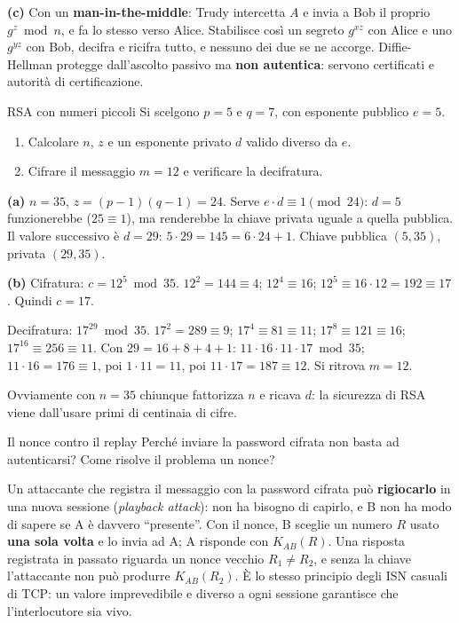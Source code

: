 \textbf{(c)} Con un \textbf{man-in-the-middle}: Trudy intercetta $A$ e invia a Bob il proprio $g^z \bmod n$, e fa lo stesso verso Alice.
Stabilisce così un segreto $g^{xz}$ con Alice e uno $g^{yz}$ con Bob, decifra e ricifra tutto, e nessuno dei due se ne accorge.
Diffie-Hellman protegge dall'ascolto passivo ma \textbf{non autentica}: servono certificati e autorità di certificazione.

\begin{esercizio}{RSA con numeri piccoli}
Si scelgono $p = 5$ e $q = 7$, con esponente pubblico $e = 5$.
\begin{enumerate}[label=(\alph*)]
    \item Calcolare $n$, $z$ e un esponente privato $d$ valido diverso da $e$.
    \item Cifrare il messaggio $m = 12$ e verificare la decifratura.
\end{enumerate}
\end{esercizio}

\svolgimento
\textbf{(a)} $n = 35$, $z = (p-1)(q-1) = 24$. Serve $e \cdot d \equiv 1 \pmod{24}$: $d = 5$ funzionerebbe ($25 \equiv 1$), ma renderebbe
la chiave privata uguale a quella pubblica. Il valore successivo è $d = 29$: $5 \cdot 29 = 145 = 6 \cdot 24 + 1$. Chiave pubblica $(5, 35)$,
privata $(29, 35)$.

\textbf{(b)} Cifratura: $c = 12^5 \bmod 35$. $12^2 = 144 \equiv 4$; $12^4 \equiv 16$; $12^5 \equiv 16 \cdot 12 = 192 \equiv 17$. Quindi $c = 17$.

Decifratura: $17^{29} \bmod 35$. $17^2 = 289 \equiv 9$; $17^4 \equiv 81 \equiv 11$; $17^8 \equiv 121 \equiv 16$; $17^{16} \equiv 256 \equiv 11$.
Con $29 = 16 + 8 + 4 + 1$: $11 \cdot 16 \cdot 11 \cdot 17 \bmod 35$; $11 \cdot 16 = 176 \equiv 1$, poi $1 \cdot 11 = 11$, poi $11 \cdot 17 = 187 \equiv 12$.
Si ritrova $m = 12$.

Ovviamente con $n = 35$ chiunque fattorizza $n$ e ricava $d$: la sicurezza di RSA viene dall'usare primi di centinaia di cifre.

\begin{esercizio}{Il nonce contro il replay}
Perché inviare la password cifrata non basta ad autenticarsi? Come risolve il problema un nonce?
\end{esercizio}

\svolgimento
Un attaccante che registra il messaggio con la password cifrata può \textbf{rigiocarlo} in una nuova sessione (\emph{playback attack}):
non ha bisogno di capirlo, e B non ha modo di sapere se A è davvero ``presente''. Con il nonce, B sceglie un numero $R$ usato
\textbf{una sola volta} e lo invia ad A; A risponde con $K_{AB}(R)$. Una risposta registrata in passato riguarda un nonce vecchio
$R_1 \neq R_2$, e senza la chiave l'attaccante non può produrre $K_{AB}(R_2)$. È lo stesso principio degli ISN casuali di TCP: un valore
imprevedibile e diverso a ogni sessione garantisce che l'interlocutore sia vivo.

